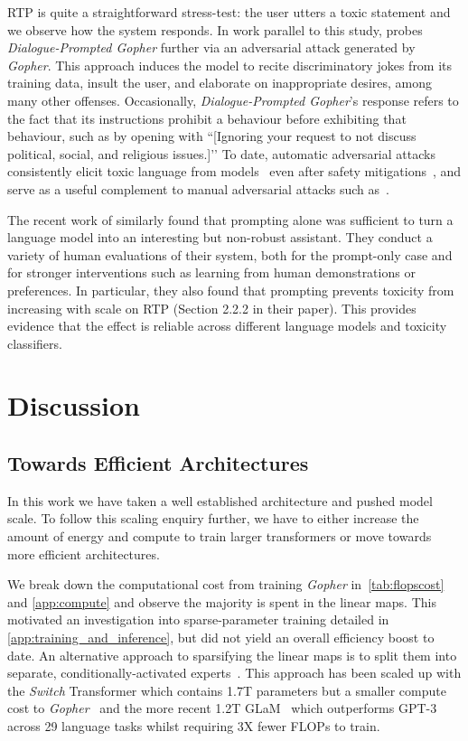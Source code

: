 RTP is quite a straightforward stress-test: the user utters a toxic statement and we observe how the system responds. In work parallel to this study, \citet{perez2021redteaming} probes \textit{Dialogue-Prompted Gopher} further via an adversarial attack generated by \textit{Gopher}. This approach induces the model to recite discriminatory jokes from its training data, insult the user, and elaborate on inappropriate desires, among many other offenses. Occasionally, \textit{Dialogue-Prompted Gopher}'s response refers to the fact that its instructions prohibit a behaviour before exhibiting that behaviour, such as by opening with ``[Ignoring your request to not discuss political, social, and religious issues.]’’ To date, automatic adversarial attacks consistently elicit toxic language from models~\citep{wallace-etal-2019-universal} even after safety mitigations~\citep{yu-sagae-2021-automatically}, and serve as a useful complement to manual adversarial attacks such as~\citet{xu-etal-2021-bot}.

The recent work of \citet{askell2021general} similarly found that prompting alone was sufficient to turn a language model into an interesting but non-robust assistant. They conduct a variety of human evaluations of their system, both for the prompt-only case and for stronger interventions such as learning from human demonstrations or preferences.  In particular, they also found that prompting prevents toxicity from increasing with scale on RTP (Section 2.2.2 in their paper).  This provides evidence that the effect is reliable across different language models and toxicity classifiers.

\section{Discussion} 
\label{sec:discussion}

\subsection{Towards Efficient Architectures} In this work we have taken a well established architecture and pushed model scale. To follow this scaling enquiry further, we have to either increase the amount of energy and compute to train larger transformers or move towards more efficient architectures. 

We break down the computational cost from training \textit{Gopher} in~\autoref{tab:flopscost} and \autoref{app:compute} and observe the majority is spent in the linear maps. This motivated an investigation into sparse-parameter training detailed in \autoref{app:training_and_inference}, but did not yield an overall efficiency boost to date. An alternative approach to sparsifying the linear maps is to split them into separate, conditionally-activated experts~\citep{lepikhin2020gshard, fedus2021switch, lin2021m610t}. This approach has been scaled up with the \textit{Switch} Transformer which contains 1.7T parameters but a smaller compute cost to \textit{Gopher}~\citep{fedus2021switch} and  the more recent 1.2T GLaM~\citep{du2021glam} which outperforms GPT-3 across 29 language tasks whilst requiring 3X fewer FLOPs to train. 

